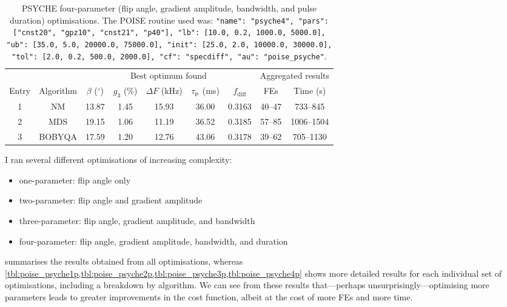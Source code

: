 \begin{table}
    \centering
    \begin{tabular}{ccccccccc}
        \toprule
              &           & \multicolumn{5}{c}{Best optimum found} & \multicolumn{2}{c}{Aggregated results} \\
                            \cmidrule(lr){3-7}                       \cmidrule(lr){8-9}
        Entry & Algorithm & $\beta$ ($^\circ$) & $g_3$ (\%) & $\Delta F$ (\unit{\kHz}) & $\tau_\mathrm{p}$ (\unit{\ms}) & $f_\text{diff}$ & FEs    & Time (\unit{\s}) \\
        \midrule
        1     & NM        & 13.87              & 1.45       & 15.93                  & 36.00              & 0.3163          & 40--47 & 733--845       \\
        2     & MDS       & 19.15              & 1.06       & 11.19                  & 36.52              & 0.3185          & 57--85 & 1006--1504     \\
        3     & BOBYQA    & 17.59              & 1.20       & 12.76                  & 43.06              & 0.3178          & 39--62 & 705--1130      \\
        \bottomrule
    \end{tabular}
    \caption[PSYCHE four-parameter optimisations]{
        PSYCHE four-parameter (flip angle, gradient amplitude, bandwidth, and pulse duration) optimisations.
        The POISE routine used was: \texttt{{"name": "psyche4", "pars": ["cnst20", "gpz10", "cnst21", "p40"], "lb": [10.0, 0.2, 1000.0, 5000.0], "ub": [35.0, 5.0, 20000.0, 75000.0], "init": [25.0, 2.0, 10000.0, 30000.0], "tol": [2.0, 0.2, 500.0, 2000.0], "cf": "specdiff", "au": "poise_psyche"}}.
    }
    \label{tbl:poise_psyche4p}
\end{table}

I ran several different optimisations of increasing complexity:
\begin{itemize}
    \item one-parameter: flip angle only
    \item two-parameter: flip angle and gradient amplitude
    \item three-parameter: flip angle, gradient amplitude, and bandwidth
    \item four-parameter: flip angle, gradient amplitude, bandwidth, and duration
\end{itemize}

 summarises the results obtained from all optimisations, whereas \cref{tbl:poise_psyche1p,tbl:poise_psyche2p,tbl:poise_psyche3p,tbl:poise_psyche4p} shows more detailed results for each individual set of optimisations, including a breakdown by algorithm.
We can see from these results that---perhaps unsurprisingly---optimising more parameters leads to greater improvements in the cost function, albeit at the cost of more FEs and more time.

